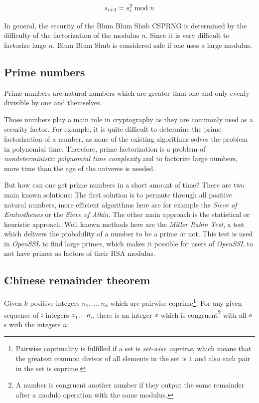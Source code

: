$$s_{i+1} = s_{i}^2 \ \text{mod}\ n$$

In general, the security of the Blum Blum Shub CSPRNG is determined by the
difficulty of the factorization of the modulus $n$. Since it is very difficult
to factorize huge $n$, Blum Blum Shub is considered safe if one uses a large
modulus.

\cite{blum1986simple}

\subsection{Prime numbers}

Prime numbers are natural numbers which are greater than one and only evenly
divisible by one and themselves.

Those numbers play a main role in cryptography as they are commonly used
as a security factor. For example, it is quite difficult to determine the
prime factorization of a number, as none of the existing algorithms solves
the problem in polynomial time. Therefore, prime factorization is a problem
of \textit{nondeterministic polynomial time complexity} and to factorize
large numbers, more time than the age of the universe is needed.

But how can one get prime numbers in a short amount of time? There are two
main known solutions: The first solution is to permute through all positive
natural numbers, more efficient algorithms here are for example the
\textit{Sieve of Eratosthenes} or the \textit{Sieve of Atkin}. The other
main approach is the statistical or heuristic approach. Well known methods
here are the \textit{Miller Rabin Test}, a test which delivers the probability
of a number to be a prime or not. This test is used in \textit{OpenSSL} to
find large primes, which makes it possible for users of \textit{OpenSSL} to
not have primes as factors of their RSA modulus.

\subsection{Chinese remainder theorem}

Given $k$ positive integers $n_1, \ldots, n_k$ which are pairwise coprime\footnote{
  Pairwise coprimality is fulfilled if a set is \textit{set-wise coprime},
  which means that the greatest common divisor of all elements in the set
  is $1$ and also each pair in the set is coprime.
}. For any given sequence of $i$ integers  $a_1, \ldots a_i$, there is an integer
$x$ which is congruent\footnote{
  A number is congruent another number if they output the same remainder
  after a modulo operation with the same modulus.
}
with all $a$s with the integers $n$:

